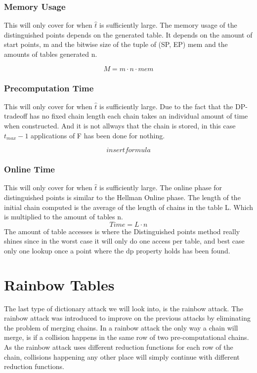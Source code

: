 \subsubsection{Memory Usage}
This will only cover for when $\hat{t}$ is sufficiently large.
The memory usage of the distinguished points depends on the generated table. It depends on the amount of start points, m and the bitwise size of the tuple of (SP, EP) mem and the amounts of tables generated n.

\begin{equation}
  M=m\cdot n\cdot mem
\end{equation}

\subsubsection{Precomputation Time}
This will only cover for when $\hat{t}$ is sufficiently large.
Due to the fact that the DP-tradeoff has no fixed chain length each chain takes an individual amount of time when constructed. And it is not allways that the chain is stored, in this case $t_{max}-1$ applications of F has been done for nothing.

\begin{equation}
  insert formula
\end{equation}

\subsubsection{Online Time}
This will only cover for when $\hat{t}$ is sufficiently large.
The online phase for distinguished points is similar to the Hellman Online phase. The length of the initial chain computed is the average of the length of chains in the table L. Which is multiplied to the amount of tables n.
\begin{equation}
  Time=L\cdot n
\end{equation}
The amount of table accesses is where the Distinguished points method really shines since in the worst case it will only do one access per table, and best case only one lookup once a point where the dp property holds has been found.

\section{Rainbow Tables}
\label{sec:raintheory}

The last type of dictionary attack we will look into, is the rainbow
attack. The rainbow attack was introduced to improve on the previous
attacks by eliminating the problem of merging chains. In a rainbow
attack the only way a chain will merge, is if a collision happens in
the same row of two pre-computational chains. As the rainbow attack uses different
reduction functions for each row of the chain, collisions happening
any other place will simply continue with different reduction
functions.

